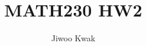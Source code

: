 \documentclass[A4]{homework}
\title{MATH230 HW2}
\author{Jiwoo Kwak}
\begin{document}
\maketitle


%


\nocite{*} 
\end{document}

